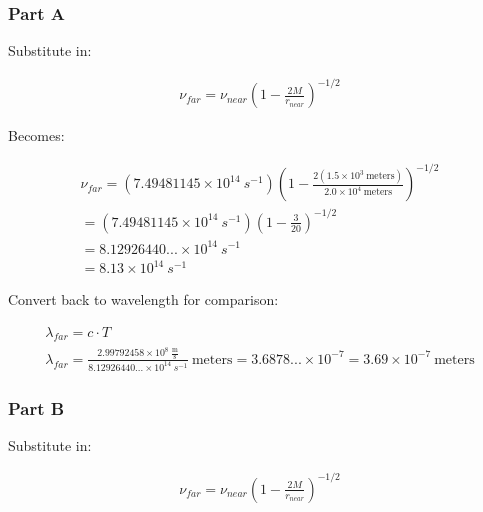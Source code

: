 \documentclass[]{report}
\begin{document}
        \subsubsection{Part A}
          Substitute in:

          \begin{equation*}
            \begin{split}
              \nu_{far} = \nu_{near}\left(1 - \frac{2M}{r_{near}} \right)^{-1/2}
              \end{split}
            \end{equation*}

          Becomes:

          \begin{equation*}
            \begin{split}
              \nu_{far} = (7.49481145\times10^{14}\ s^{-1})\left(1 - \frac{2(1.5\times10^3\ \text{meters})}{2.0\times10^4\ \text{meters}} \right)^{-1/2}\\
              = (7.49481145\times10^{14}\ s^{-1})\left(1 - \frac{3}{20} \right)^{-1/2}
              \\ = 8.12926440...\times10^{14}\ s^{-1}
              \\ = 8.13\times10^{14}\ s^{-1}
              \end{split}
            \end{equation*}

          Convert back to wavelength for comparison:

          \begin{equation*}
            \begin{split}
              \lambda_{far} = c\cdot T \\
              \lambda_{far} = \frac{2.99792458\times10^8\ \frac{\text{m}}{\text{s}}}{8.12926440...\times10^{14}\ s^{-1}}\ \text{meters} = 3.6878...\times10^{-7} = 3.69\times10^{-7}\ \text{meters}
              \end{split}
            \end{equation*}

        \subsubsection{Part B}
          Substitute in:

          \begin{equation*}
            \begin{split}
              \nu_{far} = \nu_{near}\left(1 - \frac{2M}{r_{near}} \right)^{-1/2}
              \end{split}
            \end{equation*}
\end{document}

